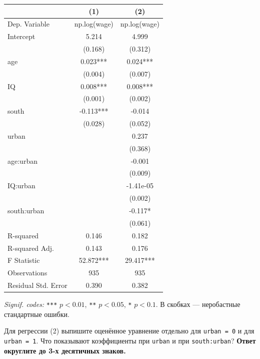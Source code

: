 \documentclass[
  russian,
]{article}
\newcounter{none} %
\begin{document}
{\def\LTcaptype{none} %
\begin{longtable}[]{@{}lcc@{}}
\toprule\noalign{}
& (1) & (2) \\
\midrule\noalign{}
\endhead
\bottomrule\noalign{}
\endlastfoot
Dep. Variable & np.log(wage) & np.log(wage) \\
Intercept & 5.214 & 4.999 \\
& (0.168) & (0.312) \\
age & 0.023*** & 0.024*** \\
& (0.004) & (0.007) \\
IQ & 0.008*** & 0.008*** \\
& (0.001) & (0.002) \\
south & -0.113*** & -0.014 \\
& (0.028) & (0.052) \\
urban & & 0.237 \\
& & (0.368) \\
age:urban & & -0.001 \\
& & (0.009) \\
IQ:urban & & -1.41e-05 \\
& & (0.002) \\
south:urban & & -0.117* \\
& & (0.061) \\
R-squared & 0.146 & 0.182 \\
R-squared Adj. & 0.143 & 0.176 \\
F Statistic & 52.872*** & 29.417*** \\
Observations & 935 & 935 \\
Residual Std. Error & 0.390 & 0.382 \\
\end{longtable}
}

\emph{Signif. codes:} \texttt{***} \(p<0.01\), \texttt{**} \(p<0.05\),
\texttt{*} \(p<0.1\). В скобках --- неробастные стандартные ошибки.

Для регрессии (2) выпишите оценённое уравнение отдельно для
\texttt{urban\ =\ 0} и для \texttt{urban\ =\ 1}. Что показывают
коэффициенты при \texttt{urban} и при \texttt{south:urban}?
\textbf{Ответ округлите до 3-х десятичных знаков.}
\end{document}
